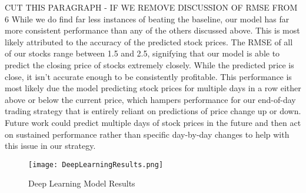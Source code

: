 \documentclass[../thesis.tex]{subfiles}
\begin{document}
CUT THIS PARAGRAPH - IF WE REMOVE DISCUSSION OF RMSE FROM 6
While we do find far less instances of beating the baseline, our model has far more consistent performance than any of the others discussed above. This is most likely attributed to the accuracy of the predicted stock prices. The RMSE of all of our stocks range between 1.5 and 2.5, signifying that our model is able to predict the closing price of stocks extremely closely. While the predicted price is close, it isn't accurate enough to be consistently profitable. This performance is most likely due the model predicting stock prices for multiple days in a row either above or below the current price, which hampers performance for our end-of-day trading strategy that is entirely reliant on  predictions of price change up or down. Future work could predict multiple days of stock prices in the future and then act on sustained performance rather than specific day-by-day changes to help with this issue in our strategy. 

\begin{figure}[h]
\centering
\texttt{[image: DeepLearningResults.png]}
\caption{Deep Learning Model Results \label{overflow}}
\label{deepresults}
\end{figure}
\end{document}
